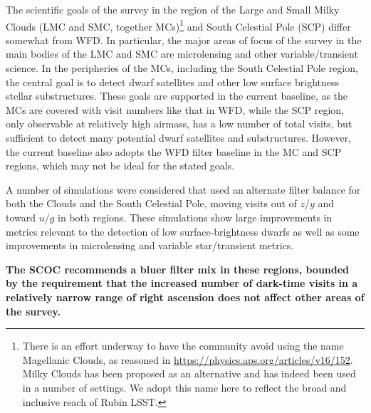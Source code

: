 The scientific goals of the survey in the region of the Large and Small Milky Clouds (LMC and SMC, together MCs)\footnote{There is an effort underway to have the community avoid using the name Magellanic Clouds, as reasoned in \url{https://physics.aps.org/articles/v16/152}. Milky Clouds has been proposed as an alternative and has indeed been used in a number of settings. We adopt this name here to reflect the broad and inclusive reach of Rubin LSST.} and South Celestial Pole (SCP) differ somewhat from WFD. In particular, the major areas of focus of the survey in the main bodies of the LMC and SMC are microlensing and other variable/transient science. In the peripheries of the MCs, including the South Celestial Pole region, the central goal is to detect dwarf satellites and other low surface brightness stellar substructures.
These goals are supported in the current baseline, as the MCs are covered with visit numbers like that in WFD, while the SCP region, only observable at relatively high airmass, has a low number of total visits, but sufficient to detect many potential dwarf satellites and substructures. However, the current baseline also adopts the WFD filter baseline in the MC and SCP regions, which may not be ideal for the stated goals.


A number of simulations were considered that used an alternate filter balance for both the Clouds and the South Celestial Pole, moving visits out of $z$/$y$ and toward $u$/$g$ in both regions. These simulations show large improvements in metrics relevant to the detection of low surface-brightness dwarfs as well as some improvements in microlensing and variable star/transient metrics. 

{\bf The SCOC recommends a bluer filter mix in these regions, bounded by the requirement that the increased number of dark-time visits in a relatively narrow range of right ascension does not affect other areas of the survey.} 

